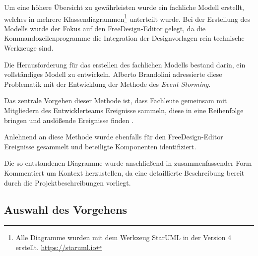 Um eine höhere Übersicht zu gewährleisten wurde ein fachliche Modell erstellt, welches in mehrere Klassendiagrammen\footnote{Alle Diagramme wurden mit dem Werkzeug StarUML in der Version 4 erstellt. \url{https://staruml.io}} unterteilt wurde. Bei der Erstellung des Modells wurde der Fokus auf den FreeDesign-Editor gelegt, da die Kommandozeilenprogramme die Integration der Designvorlagen rein technische Werkzeuge sind. 

Die Herausforderung für das erstellen des fachlichen Modells bestand darin, ein vollständiges Modell zu entwickeln. Alberto Brandolini adressierte diese Problematik mit der Entwicklung der Methode des \emph{Event Storming}. 

Das zentrale Vorgehen dieser Methode ist, dass Fachleute gemeinsam mit Mitgliedern des Entwicklerteams Ereignisse sammeln, diese in eine Reihenfolge bringen und auslößende Ereignisse finden \autocite[vgl.][]{Brandolini2013}. 

Anlehnend an diese Methode wurde ebenfalls für den FreeDesign-Editor Ereignisse gesammelt und beteiligte Komponenten identifiziert. 

Die so entstandenen Diagramme wurde anschließend in zusammenfassender Form Kommentiert um Kontext herzustellen, da eine detaillierte Beschreibung bereit durch die Projektbeschreibungen vorliegt.


\subsection{Auswahl des Vorgehens}
